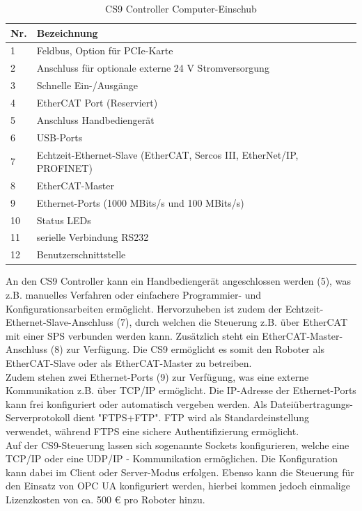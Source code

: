 \documentclass[ a4paper,
                oneside,
                toc=bibliography,
                toc=listof
                ]{scrbook}
\begin{document}
   	\begin{longtable}{p{1cm}p{12cm}}
   		\caption{CS9 Controller Computer-Einschub}
   		\label{table:ComputerEinschub}\\
   		\hline
   		Nr. & Bezeichnung  \\ [0.5ex] 
   		\hline
   		\endhead
   		1 & Feldbus, Option für PCIe-Karte  \\ 
   		2 & Anschluss für optionale externe 24 V Stromversorgung  \\
   		3 & Schnelle Ein-/Ausgänge  \\
   		4 & EtherCAT Port (Reserviert) \\
   		5 & Anschluss Handbediengerät  \\
   		6 & USB-Ports \\  
   		7 & Echtzeit-Ethernet-Slave (EtherCAT, Sercos III, EtherNet/IP, PROFINET)  \\ 
   		8 & EtherCAT-Master  \\ 
   		9 & Ethernet-Ports (1000 MBits/s und 100 MBits/s)  \\
   		10 & Status LEDs  \\ 
   		11 & serielle Verbindung RS232  \\
   		12 & Benutzerschnittstelle  \\  
   		\hline
   	\end{longtable}
   	An den CS9 Controller kann ein Handbediengerät angeschlossen werden (5), was z.B.  manuelles Verfahren oder einfachere Programmier- und Konfigurationsarbeiten ermöglicht. Hervorzuheben ist zudem der Echtzeit-Ethernet-Slave-Anschluss (7), durch welchen die Steuerung z.B. über EtherCAT mit einer SPS verbunden werden kann. Zusätzlich steht ein EtherCAT-Master-Anschluss (8) zur Verfügung. Die CS9 ermöglicht es somit den Roboter als EtherCAT-Slave oder als EtherCAT-Master zu betreiben.\\
   	Zudem stehen zwei Ethernet-Ports (9) zur Verfügung, was eine externe Kommunikation z.B. über TCP/IP ermöglicht. Die IP-Adresse der Ethernet-Ports kann frei konfiguriert oder automatisch vergeben werden. Als Dateiübertragungs-Serverprotokoll dient "FTPS+FTP". FTP wird als Standardeinstellung verwendet, während FTPS eine sichere Authentifizierung ermöglicht. \\
   	Auf der CS9-Steuerung lassen sich sogenannte Sockets konfigurieren, welche eine TCP/IP oder eine UDP/IP - Kommunikation ermöglichen. Die Konfiguration kann dabei im Client oder Server-Modus erfolgen. \cite{CS9} Ebenso kann die Steuerung für den Einsatz von OPC UA konfiguriert werden, hierbei kommen jedoch einmalige Lizenzkosten von ca. 500 € pro Roboter hinzu.
   	 
\end{document}
